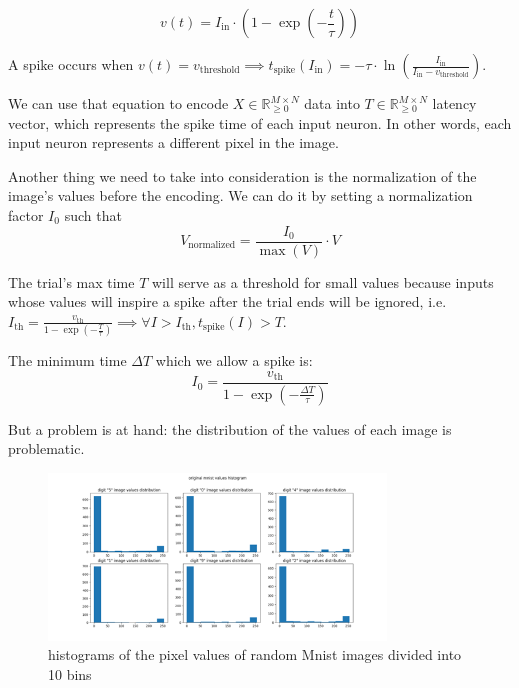 \begin{equation}
    v(t) = I_{\text{in}} \cdot \left(1 - \exp\left(-\frac{t}{\tau}\right)\right)
\end{equation}

A spike occurs when $v(t) = v_{\text{threshold}} \implies t_{\text{spike}}(I_{\text{in}}) = -\tau \cdot \ln\left(\frac{I_{\text{in}}}{I_{\text{in}} - v_{\text{threshold}}}\right)$.

We can use that equation to encode $X \in \mathbb{R}_{\geq 0}^{M \times N}$ data into $T \in \mathbb{R}_{\geq 0}^{M \times N}$ latency vector, which represents the spike time of each input neuron. In other words, each input neuron represents a different pixel in the image.

Another thing we need to take into consideration is the normalization of the image's values before the encoding. We can do it by setting a normalization factor $I_0$ such that 
\begin{equation}
V_{\text{normalized}} = \frac{I_0}{\max(V)} \cdot V
\end{equation}

The trial's max time $T$ will serve as a threshold for small values because inputs whose values will inspire a spike after the trial ends will be ignored, i.e. $I_{\text{th}} = \frac{v_{\text{th}}}{1 - \exp\left(-\frac{T}{\tau}\right)} \implies \forall I > I_{\text{th}}, t_{\text{spike}}(I) > T$.

The minimum time $\Delta T$ which we allow a spike is:
\begin{equation}
I_0 = \frac{v_{\text{th}}}{1 - \exp\left(-\frac{\Delta T}{\tau}\right)}
\end{equation}

But a problem is at hand: the distribution of the values of each image is problematic.

\begin{figure}[H]
    \centering
    \includegraphics[width=0.8\textwidth]{methods/spike-encoding/graphs/mnist-values-histogram.png}
    \caption{histograms of the pixel values of random Mnist images divided into 10 bins}
    \label{fig:mnist-values-histogram}
\end{figure}

